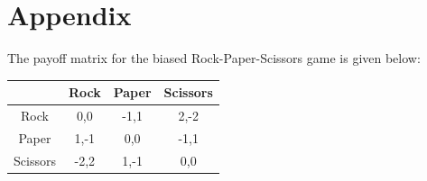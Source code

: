 \documentclass[10pt,a4paper]{article}
\begin{document}
{}


\section*{Appendix}
The payoff matrix for the biased Rock-Paper-Scissors game is given below:
\begin{center}
\begin{tabular}{|c|c|c|c|}
\hline
& Rock & Paper & Scissors \\ \hline
Rock & 0,0 & -1,1 & 2,-2 \\ \hline
Paper & 1,-1 & 0,0 & -1,1 \\ \hline
Scissors &-2,2 & 1,-1 & 0,0 \\ \hline
\end{tabular}
\end{center}
\end{document}
